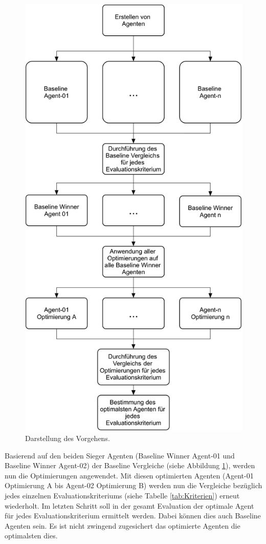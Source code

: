 \begin{figure}[H]
	\centering
	\includegraphics[scale=0.11]{Abbildungen/Vorgehen.png}
	\caption[Flussdiagramm des Vorgehens]{Darstellung des Vorgehens.}
	\label{fig:Vorgehen}
\end{figure}
Basierend auf den beiden Sieger Agenten (Baseline Winner Agent-01 und Baseline Winner Agent-02) der Baseline Vergleiche (siehe Abbildung \ref{fig:Vorgehen}), werden nun die Optimierungen angewendet. 
Mit diesen optimierten Agenten (Agent-01 Optimierung A bis Agent-02 Optimierung B) werden nun die Vergleiche bezüglich jedes einzelnen Evaluationskriteriums (siehe Tabelle \ref{tab:Kriterien}) erneut wiederholt.
Im letzten Schritt soll in der gesamt Evaluation der optimale Agent für jedes Evaluationskriterium ermittelt werden. Dabei können dies auch Baseline Agenten sein. Es ist nicht zwingend zugesichert das optimierte Agenten die optimalsten dies.

